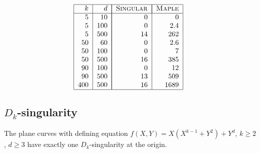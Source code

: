 \documentclass[a4paper,11pt]{amsart}%
\theoremstyle{definition}
\theoremstyle{plain}
\theoremstyle{remark}
\begin{document}
\[%
\begin{tabular}
[c]{ll|ll|}\hline
\multicolumn{1}{|r}{$k$} & \multicolumn{1}{|r|}{$d$} &
\multicolumn{1}{|l|}{\textsc{Singular}{}} &
\multicolumn{1}{|l|}{\textsc{Maple}}\\\hline
\multicolumn{1}{|r}{$5$} & \multicolumn{1}{|r|}{$10$} &
\multicolumn{1}{|r}{$0$} & \multicolumn{1}{|r|}{$0$}\\
\multicolumn{1}{|r}{$5$} & \multicolumn{1}{|r|}{$100$} &
\multicolumn{1}{|r}{$0$} & \multicolumn{1}{|r|}{$2.4$}\\
\multicolumn{1}{|r}{$5$} & \multicolumn{1}{|r|}{$500$} &
\multicolumn{1}{|r}{$14$} & \multicolumn{1}{|r|}{$262$}\\
\multicolumn{1}{|r}{$50$} & \multicolumn{1}{|r|}{$60$} &
\multicolumn{1}{|r}{$0$} & \multicolumn{1}{|r|}{$2.6$}\\
\multicolumn{1}{|r}{$50$} & \multicolumn{1}{|r|}{$100$} &
\multicolumn{1}{|r}{$0$} & \multicolumn{1}{|r|}{$7$}\\
\multicolumn{1}{|r}{$50$} & \multicolumn{1}{|r|}{$500$} &
\multicolumn{1}{|r}{$16$} & \multicolumn{1}{|r|}{$385$}\\
\multicolumn{1}{|r}{$90$} & \multicolumn{1}{|r|}{$100$} &
\multicolumn{1}{|r}{$0$} & \multicolumn{1}{|r|}{$12$}\\
\multicolumn{1}{|r}{$90$} & \multicolumn{1}{|r|}{$500$} &
\multicolumn{1}{|r}{$13$} & \multicolumn{1}{|r|}{$509$}\\
\multicolumn{1}{|r}{$400$} & \multicolumn{1}{|r|}{$500$} &
\multicolumn{1}{|r}{$16$} & \multicolumn{1}{|r|}{$1689$}\\\hline
\end{tabular}
\ \
\]


\subsection{\texorpdfstring{$D_{k}$}{Dk}-singularity}

The plane curves with defining equation $f(X,Y)=X(X^{k-1}+Y^{2})+Y^{d}$,
$k\geq2$, $d\geq3$ have exactly one $D_{k}$-singularity at the origin.
\end{document}

